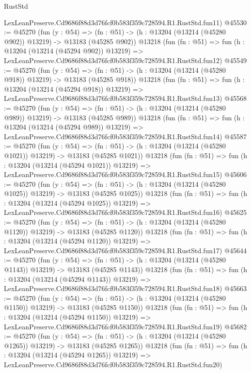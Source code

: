 \begin{lexlean}{RustStd}
\begin{coremodule}
    LexLeanPreserve.Cd9686f88d3d76fcf0b583f359c728594.R1.RustStd.fun11)
@45530 := @45270
    (fun (y : @54) =>
    (fn : @51) -> (h : @13204 (@13214 (@45280 @902)) @13219) -> @13183 (@45285 @902))
    @13218
    (fun (fn : @51) =>
    fun (h : @13204 (@13214 (@45294 @902)) @13219) =>
    LexLeanPreserve.Cd9686f88d3d76fcf0b583f359c728594.R1.RustStd.fun12)
@45549 := @45270
    (fun (y : @54) =>
    (fn : @51) -> (h : @13204 (@13214 (@45280 @918)) @13219) -> @13183 (@45285 @918))
    @13218
    (fun (fn : @51) =>
    fun (h : @13204 (@13214 (@45294 @918)) @13219) =>
    LexLeanPreserve.Cd9686f88d3d76fcf0b583f359c728594.R1.RustStd.fun13)
@45568 := @45270
    (fun (y : @54) =>
    (fn : @51) -> (h : @13204 (@13214 (@45280 @989)) @13219) -> @13183 (@45285 @989))
    @13218
    (fun (fn : @51) =>
    fun (h : @13204 (@13214 (@45294 @989)) @13219) =>
    LexLeanPreserve.Cd9686f88d3d76fcf0b583f359c728594.R1.RustStd.fun14)
@45587 := @45270
    (fun (y : @54) =>
    (fn : @51) -> (h : @13204 (@13214 (@45280 @1021)) @13219) -> @13183 (@45285 @1021))
    @13218
    (fun (fn : @51) =>
    fun (h : @13204 (@13214 (@45294 @1021)) @13219) =>
    LexLeanPreserve.Cd9686f88d3d76fcf0b583f359c728594.R1.RustStd.fun15)
@45606 := @45270
    (fun (y : @54) =>
    (fn : @51) -> (h : @13204 (@13214 (@45280 @1025)) @13219) -> @13183 (@45285 @1025))
    @13218
    (fun (fn : @51) =>
    fun (h : @13204 (@13214 (@45294 @1025)) @13219) =>
    LexLeanPreserve.Cd9686f88d3d76fcf0b583f359c728594.R1.RustStd.fun16)
@45625 := @45270
    (fun (y : @54) =>
    (fn : @51) -> (h : @13204 (@13214 (@45280 @1120)) @13219) -> @13183 (@45285 @1120))
    @13218
    (fun (fn : @51) =>
    fun (h : @13204 (@13214 (@45294 @1120)) @13219) =>
    LexLeanPreserve.Cd9686f88d3d76fcf0b583f359c728594.R1.RustStd.fun17)
@45644 := @45270
    (fun (y : @54) =>
    (fn : @51) -> (h : @13204 (@13214 (@45280 @1143)) @13219) -> @13183 (@45285 @1143))
    @13218
    (fun (fn : @51) =>
    fun (h : @13204 (@13214 (@45294 @1143)) @13219) =>
    LexLeanPreserve.Cd9686f88d3d76fcf0b583f359c728594.R1.RustStd.fun18)
@45663 := @45270
    (fun (y : @54) =>
    (fn : @51) -> (h : @13204 (@13214 (@45280 @1150)) @13219) -> @13183 (@45285 @1150))
    @13218
    (fun (fn : @51) =>
    fun (h : @13204 (@13214 (@45294 @1150)) @13219) =>
    LexLeanPreserve.Cd9686f88d3d76fcf0b583f359c728594.R1.RustStd.fun19)
@45682 := @45270
    (fun (y : @54) =>
    (fn : @51) -> (h : @13204 (@13214 (@45280 @1265)) @13219) -> @13183 (@45285 @1265))
    @13218
    (fun (fn : @51) =>
    fun (h : @13204 (@13214 (@45294 @1265)) @13219) =>
    LexLeanPreserve.Cd9686f88d3d76fcf0b583f359c728594.R1.RustStd.fun20)

\end{coremodule}
\end{lexlean}
